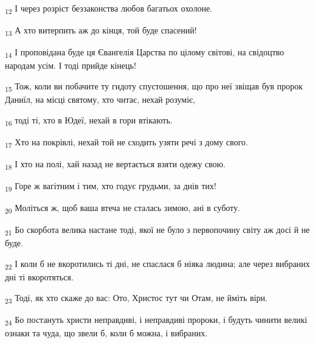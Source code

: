 \begin{tcolorbox}
\textsubscript{12} І через розріст беззаконства любов багатьох охолоне.
\end{tcolorbox}
\begin{tcolorbox}
\textsubscript{13} А хто витерпить аж до кінця, той буде спасений!
\end{tcolorbox}
\begin{tcolorbox}
\textsubscript{14} І проповідана буде ця Євангелія Царства по цілому світові, на свідоцтво народам усім. І тоді прийде кінець!
\end{tcolorbox}
\begin{tcolorbox}
\textsubscript{15} Тож, коли ви побачите ту гидоту спустошення, що про неї звіщав був пророк Даниїл, на місці святому, хто читає, нехай розуміє,
\end{tcolorbox}
\begin{tcolorbox}
\textsubscript{16} тоді ті, хто в Юдеї, нехай в гори втікають.
\end{tcolorbox}
\begin{tcolorbox}
\textsubscript{17} Хто на покрівлі, нехай той не сходить узяти речі з дому свого.
\end{tcolorbox}
\begin{tcolorbox}
\textsubscript{18} І хто на полі, хай назад не вертається взяти одежу свою.
\end{tcolorbox}
\begin{tcolorbox}
\textsubscript{19} Горе ж вагітним і тим, хто годує грудьми, за днів тих!
\end{tcolorbox}
\begin{tcolorbox}
\textsubscript{20} Моліться ж, щоб ваша втеча не сталась зимою, ані в суботу.
\end{tcolorbox}
\begin{tcolorbox}
\textsubscript{21} Бо скорбота велика настане тоді, якої не було з первопочину світу аж досі й не буде.
\end{tcolorbox}
\begin{tcolorbox}
\textsubscript{22} І коли б не вкоротились ті дні, не спаслася б ніяка людина; але через вибраних дні ті вкоротяться.
\end{tcolorbox}
\begin{tcolorbox}
\textsubscript{23} Тоді, як хто скаже до вас: Ото, Христос тут чи Отам, не йміть віри.
\end{tcolorbox}
\begin{tcolorbox}
\textsubscript{24} Бо постануть христи неправдиві, і неправдиві пророки, і будуть чинити великі ознаки та чуда, що звели б, коли б можна, і вибраних.
\end{tcolorbox}
